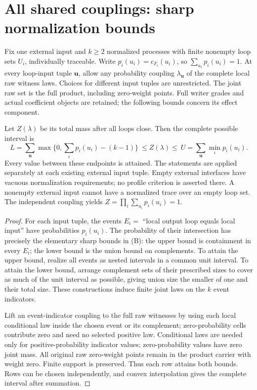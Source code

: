 \documentclass[11pt]{article}
\begin{document}
\section{All shared couplings: sharp normalization bounds}
Fix one external input and $k\ge2$ normalized processes with finite nonempty loop sets $U_i$, individually traceable. Write $p_i(u_i)=c_{F_i}(u_i)$, so $\sum_{u_i}p_i(u_i)=1$. At every loop-input tuple $\mathbf u$, allow any probability coupling $\lambda_{\mathbf u}$ of the complete local raw witness laws. Choices for different input tuples are unrestricted. The joint raw set is the full product, including zero-weight points. Full writer grades and actual coefficient objects are retained; the following bounds concern its effect component.

Let $Z(\lambda)$ be its total mass after all loops close. Then the complete possible interval is
\[
 L=\sum_{\mathbf u}\max\{0,\sum_i p_i(u_i)-(k-1)\}
 \ \le Z(\lambda)\le\ 
 U=\sum_{\mathbf u}\min_i p_i(u_i). \tag{B}
\]
Every value between these endpoints is attained. The statements are applied separately at each existing external input tuple. Empty external interfaces have vacuous normalization requirements; no profile criterion is asserted there. A nonempty external input cannot have a normalized trace over an empty loop set. The independent coupling yields $Z=\prod_i\sum_{u_i}p_i(u_i)=1$.

\begin{proof}
For each input tuple, the events $E_i=$ ``local output loop equals local input'' have probabilities $p_i(u_i)$. The probability of their intersection has precisely the elementary sharp bounds in (B): the upper bound is containment in every $E_i$; the lower bound is the union bound on complements. To attain the upper bound, realize all events as nested intervals in a common unit interval. To attain the lower bound, arrange complement sets of their prescribed sizes to cover as much of the unit interval as possible, giving union size the smaller of one and their total size. These constructions induce finite joint laws on the $k$ event indicators.

Lift an event-indicator coupling to the full raw witnesses by using each local conditional law inside the chosen event or its complement; zero-probability cells contribute zero and need no selected positive law. Conditional laws are needed only for positive-probability indicator values; zero-probability values have zero joint mass. All original raw zero-weight points remain in the product carrier with weight zero. Finite support is preserved. Thus each row attains both bounds. Rows can be chosen independently, and convex interpolation gives the complete interval after summation.
\end{proof}
\end{document}
